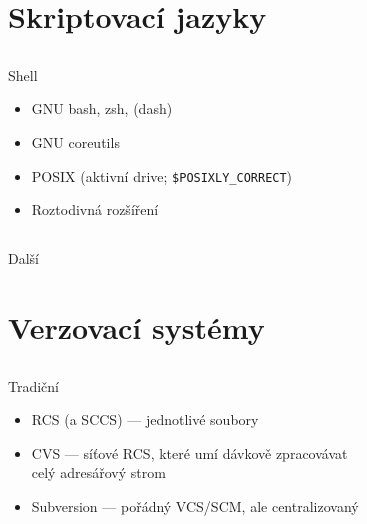 \documentclass{beamer}
\begin{document}
\section{Skriptovací jazyky}

\subsection{}
\begin{frame}{Shell}
\begin{itemize}
\item GNU bash, zsh, (dash)
\item GNU coreutils
\item POSIX (aktivní drive; {\tt \$POSIXLY\_CORRECT})
\item Roztodivná rozšíření
\end{itemize}
\end{frame}

\subsection{}
\begin{frame}{Další}
\end{frame}


\section{Verzovací systémy}

\subsection{}
\begin{frame}{Tradiční}
\begin{itemize}
\item RCS (a SCCS) --- jednotlivé soubory
\item CVS --- síťové RCS, které umí dávkově zpracovávat \\ celý adresářový strom
\item Subversion --- pořádný VCS/SCM, ale centralizovaný
\end{itemize}
\end{frame}
\end{document}
